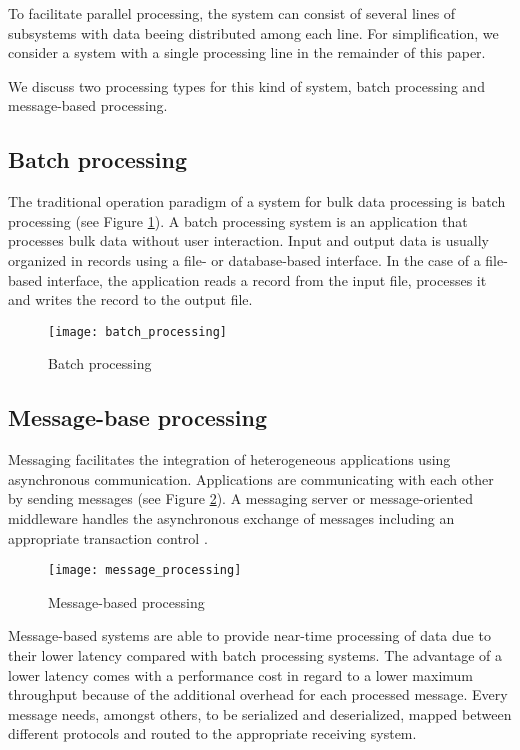To facilitate parallel processing, the system can consist of several lines of subsystems with data beeing distributed among each line. For simplification, we consider a system with a single processing line in the remainder of this paper.

We discuss two processing types for this kind of system, batch processing and message-based processing.
\subsection{Batch processing}
The traditional operation paradigm of a system for bulk data processing is batch processing (see Figure \ref{fig:batch_processing}). A batch processing system is an application that processes bulk data without user interaction. Input and output data is usually organized in records using a file- or database-based interface. In the case of a file-based interface, the application reads a record from the input file, processes it and writes the record to the output file.
\begin{figure}[h!]
	\centering
	\texttt{[image: batch\_processing]}
	\caption{Batch processing}
	\label{fig:batch_processing}
\end{figure}

\subsection{Message-base processing}
Messaging facilitates the integration of heterogeneous applications using asynchronous communication. Applications are communicating with each other by sending messages (see Figure \ref{fig:message_based_processing}). A messaging server or message-oriented middleware handles the asynchronous exchange of messages including an appropriate transaction control \citep{conrad2006enterprise}.

\begin{figure}[h!]
	\centering
	\texttt{[image: message\_processing]}
	\caption{Message-based processing}
	\label{fig:message_based_processing}
\end{figure}

Message-based systems are able to provide near-time processing of data due to their lower latency compared with batch processing systems. The advantage of a lower latency comes with a performance cost in regard to a lower maximum throughput because of the additional overhead for each processed message. Every message needs, amongst others, to be serialized and deserialized, mapped between different protocols and routed to the appropriate receiving system.

